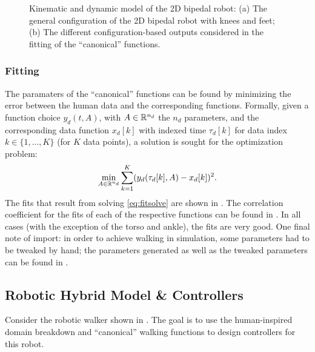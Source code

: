 \begin{figure}[t!]
  \centering
  \hspace{.2cm}
  \caption[Kinematic and dynamic model of the 2D bipedal robot.]{Kinematic and
    dynamic model of the 2D bipedal robot:
    (a) The general configuration of the 2D bipedal robot with knees and feet;
    (b) The different configuration-based outputs considered in the fitting of
    the ``canonical'' functions.}
  \label{fig:robotconstraints}
\end{figure}

\subsubsection{Fitting}
The paramaters of the ``canonical'' functions can be found by minimizing the
error between the human data and the corresponding functions.
%
Formally, given a function choice $y_d(t, A)$, with $A \in \mathbb{R}^{n_{d}}$ the $n_d$
parameters, and the corresponding data function $x_{d}[k]$ with indexed time
$\tau_{d}[k]$ for data index $k \in \{1, \ldots, K\}$ (for $K$ data points), a
solution is sought for the optimization problem:
%
\begin{align}
  \label{eq:fitsolve}
  \min_{A \in \mathbb{R}^{n_{d}}} \sum_{k=1}^{K} (y_{d}(\tau_{d}[k], A) - x_{d}[k])^2.
\end{align}
%
The fits that result from solving \eqref{eq:fitsolve} are shown in
.
%
The correlation coefficient for the fits of each of the respective functions can
be found in .
%
In all cases (with the exception of the torso and ankle), the fits are very
good.
%
One final note of import:
%
in order to achieve walking in simulation, some parameters had to be tweaked by
hand;
%
the parameters generated as well as the tweaked parameters can be found in
.




\subsection{Robotic Hybrid Model \& Controllers} \noindent
Consider the robotic walker shown in . The goal is to use the human-inspired domain breakdown and ``canonical'' walking functions to design controllers for this robot.

